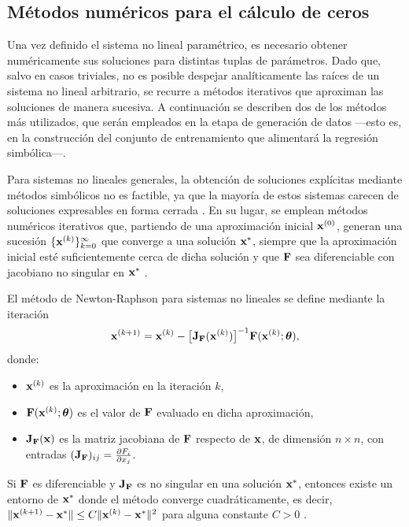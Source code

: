 \subsection{Métodos numéricos para el cálculo de ceros}

Una vez definido el sistema no lineal paramétrico, es necesario obtener numéricamente sus soluciones para distintas tuplas de parámetros. Dado que, salvo en casos triviales, no es posible despejar analíticamente las raíces de un sistema no lineal arbitrario, se recurre a métodos iterativos que aproximan las soluciones de manera sucesiva. A continuación se describen dos de los métodos más utilizados, que serán empleados en la etapa de generación de datos ---esto es, en la construcción del conjunto de entrenamiento que alimentará la regresión simbólica---.

Para sistemas no lineales generales, la obtención de soluciones explícitas mediante métodos simbólicos no es factible, ya que la mayoría de estos sistemas carecen de soluciones expresables en forma cerrada \cite{burden2010numerical}. En su lugar, se emplean métodos numéricos iterativos que, partiendo de una aproximación inicial \(\mathbf{x}^{(0)}\), generan una sucesión \(\{\mathbf{x}^{(k)}\}_{k=0}^{\infty}\) que converge a una solución \(\mathbf{x}^*\), siempre que la aproximación inicial esté suficientemente cerca de dicha solución y que \(\mathbf{F}\) sea diferenciable con jacobiano no singular en \(\mathbf{x}^*\) \cite{nocedal2006numerical}.

El método de Newton-Raphson para sistemas no lineales \cite{burden2010numerical} se define mediante la iteración \begin{equation} \mathbf{x}^{(k+1)} = \mathbf{x}^{(k)} - \bigl[\mathbf{J}_{\mathbf{F}}(\mathbf{x}^{(k)})\bigr]^{-1} \mathbf{F}(\mathbf{x}^{(k)}; \boldsymbol{\theta}), \label{eq:newton} \end{equation} donde: \begin{itemize} \item \(\mathbf{x}^{(k)}\) es la aproximación en la iteración \(k\), \item \(\mathbf{F}(\mathbf{x}^{(k)}; \boldsymbol{\theta})\) es el valor de \(\mathbf{F}\) evaluado en dicha aproximación, \item \(\mathbf{J}_{\mathbf{F}}(\mathbf{x})\) es la matriz jacobiana de \(\mathbf{F}\) respecto de \(\mathbf{x}\), de dimensión \(n \times n\), con entradas \((\mathbf{J}_{\mathbf{F}})_{ij} = \frac{\partial F_i}{\partial x_j}\). \end{itemize} Si \(\mathbf{F}\) es diferenciable y \(\mathbf{J}_{\mathbf{F}}\) es no singular en una solución \(\mathbf{x}^*\), entonces existe un entorno de \(\mathbf{x}^*\) donde el método converge cuadráticamente, es decir, \(\|\mathbf{x}^{(k+1)} - \mathbf{x}^*\| \le C \|\mathbf{x}^{(k)} - \mathbf{x}^*\|^2\) para alguna constante \(C > 0\) \cite{nocedal2006numerical}.

